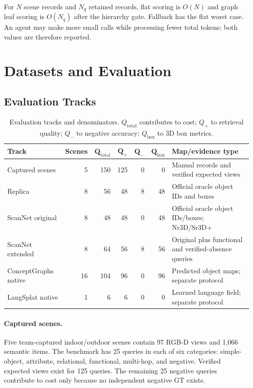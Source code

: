 \documentclass[10pt,twocolumn,letterpaper]{article}
\newcommand{\tableformat}{%
  \renewcommand{\arraystretch}{1.10}%
  \setlength{\tabcolsep}{4pt}%
}
\begin{document}
For $N$ scene records and $N_q$ retained records, flat scoring is $O(N)$ and
graph leaf scoring is $O(N_q)$ after the hierarchy gate. Fallback has the flat
worst case. An agent may make more small calls while processing fewer total
tokens; both values are therefore reported.

\section{Datasets and Evaluation}
\subsection{Evaluation Tracks}
\begin{table}[t]
\centering
\caption{Evaluation tracks and denominators. $Q_{\mathrm{total}}$ contributes
to cost; $Q_+$ to retrieval quality; $Q_-$ to negative accuracy; $Q_{\mathrm
{box}}$ to 3D box metrics.}
\label{tab:tracks}
\small
\tableformat
\begin{tabularx}{0.96\textwidth}{@{}lrrrrrY@{}}
\toprule
\textbf{Track} & \textbf{Scenes} & $\mathbf{Q_{\mathrm{total}}}$ &
$\mathbf{Q_+}$ & $\mathbf{Q_-}$ & $\mathbf{Q_{\mathrm{box}}}$ &
\textbf{Map/evidence type} \\
\midrule
Captured scenes & 5 & 150 & 125 & 0 & 0 &
Manual records and verified expected views \\
Replica & 8 & 56 & 48 & 8 & 48 &
Official oracle object IDs and boxes \\
ScanNet original & 8 & 48 & 48 & 0 & 48 &
Official oracle object IDs/boxes; Nr3D/Sr3D+ \\
ScanNet extended & 8 & 64 & 56 & 8 & 56 &
Original plus functional and verified-absence queries \\
ConceptGraphs native & 16 & 104 & 96 & 0 & 96 &
Predicted object maps; separate protocol \\
LangSplat native & 1 & 6 & 6 & 0 & 0 &
Learned language field; separate protocol \\
\bottomrule
\end{tabularx}
\end{table}

\paragraph{Captured scenes.}
Five team-captured indoor/outdoor scenes contain 97 RGB-D views and 1,066
semantic items. The benchmark has 25 queries in each of six categories:
simple-object, attribute, relational, functional, multi-hop, and negative.
Verified expected views exist for 125 queries. The remaining 25 negative
queries contribute to cost only because no independent negative GT exists.
\end{document}
